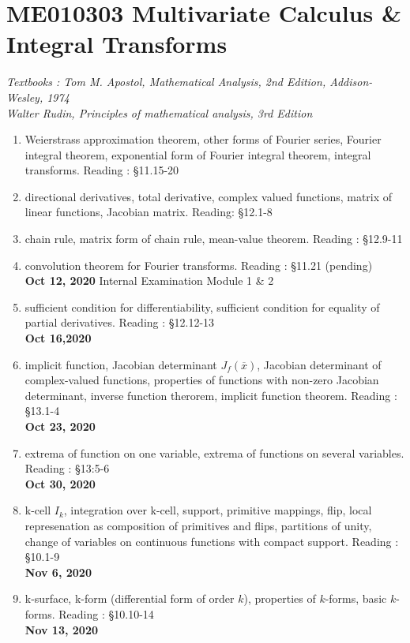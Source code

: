 \chapter{ME010303 Multivariate Calculus \& Integral Transforms}
\textit{Textbooks : Tom M. Apostol, Mathematical Analysis, 2nd Edition, Addison-Wesley, 1974\\Walter Rudin, Principles of mathematical analysis, 3rd Edition}
\begin{enumerate}[label=Week \arabic*]
	\item Weierstrass approximation theorem, other forms of Fourier series, Fourier integral theorem, exponential form of Fourier integral theorem, integral transforms. Reading : \S 11.15-20
	\item directional derivatives, total derivative, complex valued functions, matrix of linear functions, Jacobian matrix. Reading: \S 12.1-8
	\item chain rule, matrix form of chain rule, mean-value theorem. Reading : \S 12.9-11
	\item convolution theorem for Fourier transforms. Reading : \S 11.21 (pending)\\
		\textbf{Oct 12, 2020} Internal Examination Module 1 \& 2
	\item sufficient condition for differentiability, sufficient condition for equality of partial derivatives. Reading : \S 12.12-13\\
		\textbf{Oct 16,2020}
	\item implicit function, Jacobian determinant $J_f(\overline{x})$, Jacobian determinant of complex-valued functions, properties of functions with non-zero Jacobian determinant, inverse function therorem, implicit function theorem. Reading : \S 13.1-4\\
		\textbf{Oct 23, 2020}
	\item extrema of function on one variable, extrema of functions on several variables. Reading : \S 13:5-6\\
		\textbf{Oct 30, 2020}
	\item k-cell $I_k$, integration over k-cell, support, primitive mappings, flip, local represenation as composition of primitives and flips, partitions of unity, change of variables on continuous functions with compact support.  Reading : \S 10.1-9\\
		\textbf{Nov 6, 2020}
	\item k-surface, k-form (differential form of order $k$), properties of $k$-forms, basic $k$-forms. Reading : \S 10.10-14\\
		\textbf{Nov 13, 2020}
\end{enumerate}
